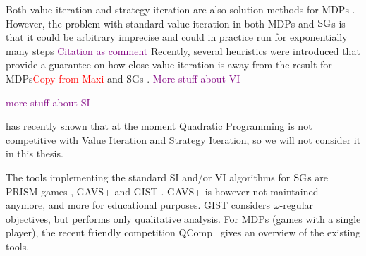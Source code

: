 Both value iteration and strategy iteration are also solution methods for MDPs \cite{Puterman}\cite{HoffmanKarp}.
However, the problem with standard value iteration in both MDPs and $\textrm{SG}$s is that it could be arbitrary imprecise \cite{haddadmonmege} and 
could in practice run for exponentially many steps \textcolor{purple}{Citation as comment}%
Recently, several heuristics were introduced that provide a guarantee on how close value iteration is away from the result for MDPs\textcolor{red}{Copy from Maxi} and SGs \cite{paperMaxi}.
\textcolor{purple}{More stuff about VI}

\textcolor{purple}{more stuff about SI}

\cite{gandalf} has recently shown that at the moment Quadratic Programming is not competitive with Value Iteration and Strategy Iteration,
so we will not consider it in this thesis.

The tools implementing the standard SI and/or VI algorithms for $\textrm{SG}$s are PRISM-games \cite{PRISM-games}, 
GAVS+ \cite{gavs+} and GIST \cite{chatterjee2010gist}.
GAVS+ is however not maintained anymore, and more for educational purposes.
GIST considers $\omega$-regular objectives, but performs only qualitative analysis. 
For MDPs (games with a single player), the recent friendly competition QComp~\cite{qcomp} gives an overview of the existing tools.